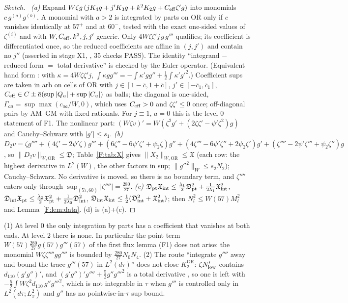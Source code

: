\documentclass[11pt]{article}
\newcommand{\fn}[1]{\texttt{\detokenize{#1}}}
\newcommand{\OR}{\mathrm{OR}}\newcommand{\eI}{\varepsilon_I}
\newcommand{\fD}{\mathfrak D}\newcommand{\fX}{\mathfrak X}\newcommand{\fa}{\mathfrak a}
\begin{document}
\begin{proof}[Sketch]\tHd\
\emph{(a)} Expand $W\zeta g\,(jK_4g+j'K_3g+k^2K_2g+C_{\rm eff}\zeta'g)$ into monomials $c\,g^{(a)}g^{(b)}$. A monomial with $a>2$ is integrated by parts on $\OR$ only if $c$ vanishes identically at $57^+$ and at $60^-$, tested with the exact one-sided values of $\zeta^{(i)}$ and with $W,C_{\rm eff},k^2,j,j'$ generic. Only $4W\zeta\zeta'j\,g\,g'''$ qualifies; its coefficient is differentiated once, so the reduced coefficients are affine in $(j,j')$ and contain no $j''$ (asserted in stage X1, \fn{flux2_forms.py}, 35 checks PASS). The identity ``integrand $-$ reduced form $=$ total derivative'' is checked by the Euler operator. (Equivalent hand form \tS: with $\kappa=4W\zeta\zeta'j$, $\int\kappa gg'''=-\int\kappa'gg''+\frac12\int\kappa'g'^2$.) Coefficient sups are taken in arb on cells of $\OR$ with $j\in[1-\bar c,1+\bar c]$, $j'\in[-\bar c_1,\bar c_1]$, $C_{\rm eff}\in C\pm\bar a(\sup|Q_u|+\sup|C_u|)$ as balls; the diagonal is one-sided, $\Gamma_{aa}=\sup\max(c_{aa}/W,0)$, which uses $C_{\rm eff}>0$ and $\zeta\zeta'\le0$ once; off-diagonal pairs by AM--GM with fixed rationals. For $j\equiv1$, $\bar a=0$ this is the level-0 statement of F1. The nonlinear part: $(W\zeta v)'=W(\zeta^2g'+(2\zeta\zeta'-\psi'\zeta^2)g)$ and Cauchy--Schwarz with $|g'|\le s_1$.
\emph{(b)} $D_2v=\zeta g''''+(4\zeta'-2\psi'\zeta)g'''+(6\zeta''-6\psi'\zeta'+\psi_2\zeta)g''+(4\zeta'''-6\psi'\zeta''+2\psi_2\zeta')g'+(\zeta''''-2\psi'\zeta'''+\psi_2\zeta'')g$ \tS, so $\|D_2v\|_{W,\OR}\le\fD$; Table~\ref{F:tab:X} gives $\|X_2\|_{W,\OR}\le\fX$ (each row: the highest derivative in $L^2(W)$, the other factors in sup; $\|g''^2\|_W\le s_2N_2$); Cauchy--Schwarz. No derivative is moved, so there is no boundary term, and $\zeta''''$ enters only through $\sup_{(57,60)}|\zeta''''|=\frac{280}{27}$.
\emph{(c)} $\fD_{\rm pt}\fX_{\rm int}\le\frac{\lambda_1}2\fD_{\rm pt}^2+\frac1{2\lambda_1}\fX_{\rm int}^2$, $\fD_{\rm int}\fX_{\rm pt}\le\frac{\lambda_2}2\fX_{\rm pt}^2+\frac1{2\lambda_2}\fD_{\rm int}^2$, $\fD_{\rm int}\fX_{\rm int}\le\frac12(\fD_{\rm int}^2+\fX_{\rm int}^2)$; then $N_l^2\le W(57)M_l^2$ and Lemma~\ref{F:lem:data}. (d) is (a)+(c).
\end{proof}

\begin{remark}\label{F:rem:trace}
(1) At level 0 the only integration by parts has a coefficient that vanishes at both ends. At level 2 there is none. In particular the point term $W(57)\frac{280}{27}g(57)g'''(57)$ of the first flux lemma (F1) does not arise: the monomial $W\zeta\zeta''''gg''''$ is bounded by $\frac{280}{27}N_0N_4$.
(2) The route ``integrate $g''''$ away and bound the trace $g'''(57)$ in $L^2(d\tau)$'' does not close $K_2^{\OR}$: $\zeta N_{\rm low}'$ contains $d_{110}(g'g'')'$, and $(g'g'')'g''''+\frac52g''g'''^2$ is a total derivative \tS, so one is left with $-\frac52\int W\zeta^2d_{110}\,g''g'''^2$, which is not integrable in $\tau$ when $g'''$ is controlled only in $L^2(d\tau;L^2_x)$ and $g''$ has no pointwise-in-$\tau$ sup bound.
\end{remark}
\end{document}
